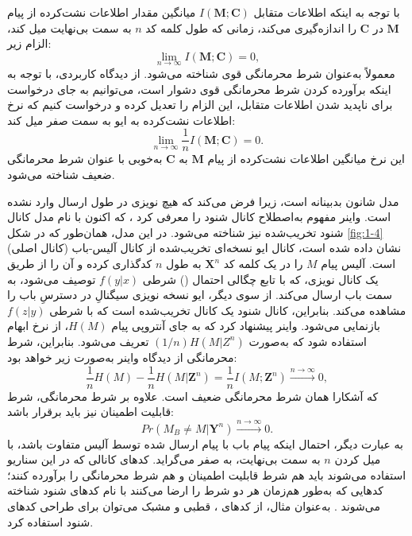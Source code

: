 با توجه به اینکه اطلاعات متقابل $I(\bm{M}; \bm{C})$ میانگین مقدار اطلاعات نشت‌کرده از پیام $\bm{M}$ در $\bm{C}$ را اندازه‌گیری می‌کند، زمانی که طول کلمه کد $n$ به سمت بی‌نهایت میل کند، الزام زیر:
\begin{equation}
	\lim_{n \to \infty} I(\bm{M}; \bm{C}) = 0,
	\label{eq:1-3}
\end{equation}
معمولاً به‌عنوان شرط محرمانگی قوی شناخته می‌شود. از دیدگاه کاربردی، با توجه به اینکه برآورده کردن شرط محرمانگی قوی دشوار است، می‌توانیم به جای درخواست برای ناپدید شدن اطلاعات متقابل، این الزام را تعدیل کرده و درخواست کنیم که نرخ اطلاعات نشت‌کرده به ایو به سمت صفر میل کند:
\begin{equation}
	\lim_{n \to \infty} \frac{1}{n} I(\bm{M}; \bm{C}) = 0.
	\label{eq:1-4}
\end{equation}
این نرخ میانگین اطلاعات نشت‌کرده از پیام $\bm{M}$ به $\bm{C}$ به‌خوبی با عنوان شرط محرمانگی ضعیف شناخته می‌شود.



مدل شانون بدبینانه است، زیرا فرض می‌کند که هیچ نویزی در طول ارسال وارد نشده است. واینر مفهوم به‌اصطلاح کانال شنود را معرفی کرد \cite{1-30}، که اکنون با نام مدل کانال شنود تخریب‌شده نیز شناخته می‌شود. در این مدل، همان‌طور که در شکل \ref{fig:1-4} نشان داده شده است، کانال ایو نسخه‌ای تخریب‌شده از کانال آلیس-باب (کانال اصلی) است. آلیس پیام $M$ را در یک کلمه کد $\bm{X}^n$ به طول $n$ کدگذاری کرده و آن را از طریق یک کانال نویزی، که با تابع چگالی احتمال () شرطی $f(y|x)$ توصیف می‌شود، به سمت باب ارسال می‌کند. از سوی دیگر، ایو نسخه نویزی سیگنالِ در دسترسِ باب را مشاهده می‌کند. بنابراین، کانال شنود یک کانال تخریب‌شده است که با  شرطی $f(z|y)$ بازنمایی می‌شود. واینر پیشنهاد کرد که به جای آنتروپی پیام $H(M)$، از نرخ ابهام استفاده شود که به‌صورت $(1/n)H(M|Z^n)$ تعریف می‌شود. بنابراین، شرط محرمانگی از دیدگاه واینر به‌صورت زیر خواهد بود:
\begin{equation}
	\frac{1}{n} H(M) - \frac{1}{n} H(M|\bm{Z}^n) = \frac{1}{n} I(M; \bm{Z}^n) \xrightarrow{n \to \infty} 0,
	\label{eq:1-5}
\end{equation}
که آشکارا همان شرط محرمانگی ضعیف است. علاوه بر شرط محرمانگی، شرط قابلیت اطمینان نیز باید برقرار باشد:
\begin{equation}
	Pr(M_B \neq M | \bm{Y}^n) \xrightarrow{n \to \infty} 0.
	\label{eq:1-6}
\end{equation}
به عبارت دیگر، احتمال اینکه پیام باب با پیام ارسال شده توسط آلیس متفاوت باشد، با میل کردن $n$ به سمت بی‌نهایت، به صفر می‌گراید. کدهای کانالی که در این سناریو استفاده می‌شوند باید هم شرط قابلیت اطمینان و هم شرط محرمانگی را برآورده کنند؛ کدهایی که به‌طور هم‌زمان هر دو شرط را ارضا می‌کنند با نام کدهای شنود شناخته می‌شوند \cite{1-31}. به‌عنوان مثال، از کدهای ، قطبی و مشبک می‌توان برای طراحی کدهای شنود استفاده کرد.


